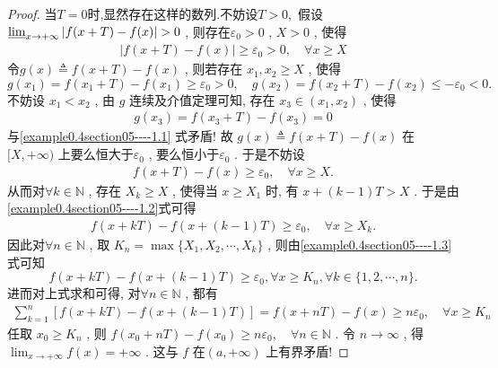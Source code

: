 \documentclass[../../main.tex]{subfiles}
\begin{document}
\begin{proof}
当$T=0$时,显然存在这样的数列.不妨设$T>0,$
假设\(\varliminf_{x \to +\infty} \vert f(x + T) - f(x)\vert > 0\) , 则存在\(\varepsilon_0 > 0\) , \(X > 0\) , 使得
\begin{align}
\vert f(x + T) - f(x)\vert \geqslant \varepsilon_0>0,\quad \forall x \geqslant X \label{example0.4section05----1.1}
\end{align}
令\(g(x) \triangleq f(x + T) - f(x)\) , 则若存在 \(x_1, x_2 \geqslant X\) , 使得
\[g(x_1) = f(x_1 + T) - f(x_1) \geqslant \varepsilon_0 > 0 ,\quad g(x_2) = f(x_2 + T) - f(x_2) \leqslant -\varepsilon_0 < 0. \]
不妨设 \(x_1 < x_2\) , 由 \(g\) 连续及介值定理可知, 存在 \(x_3 \in (x_1, x_2)\) , 使得
\begin{align*}
g(x_3) = f(x_3 + T) - f(x_3) = 0
\end{align*}
与\eqref{example0.4section05----1.1} 式矛盾! 故 \(g(x) \triangleq f(x + T) - f(x)\) 在\([X, +\infty)\) 上要么恒大于\(\varepsilon_0\) , 要么恒小于\(\varepsilon_0\) . 于是不妨设
\begin{align}
f(x + T) - f(x) \geqslant \varepsilon_0,\quad \forall x \geqslant X .\label{example0.4section05----1.2}
\end{align}
从而对\(\forall k \in \mathbb{N}\) , 存在 \(X_k \geqslant X\) , 使得当 \(x \geqslant X_1\) 时, 有
\(x + (k - 1)T > X\) .
于是由\eqref{example0.4section05----1.2}式可得
\begin{align}
f(x + kT) - f(x + (k - 1)T) \geqslant \varepsilon_0,\quad \forall x \geqslant X_k. \label{example0.4section05----1.3}
\end{align}
因此对\(\forall n \in \mathbb{N}\) , 取 \(K_n = \max\{X_1, X_2, \cdots, X_k\}\) , 则由\eqref{example0.4section05----1.3}式可知
\[
f(x + kT) - f(x + (k - 1)T)\geqslant \varepsilon_0 , \forall x \geqslant K_n ,\forall k \in \{1, 2, \cdots, n\}.
\]
进而对上式求和可得, 对\(\forall n \in \mathbb{N}\) , 都有
\begin{align*}
\sum_{k = 1}^n [f(x + kT) - f(x + (k - 1)T)] = f(x + nT) - f(x) \geqslant n\varepsilon_0,\quad \forall x \geqslant K_n
\end{align*}
任取 \(x_0 \geqslant K_n\) , 则
\(f(x_0 + nT) - f(x_0) \geqslant n\varepsilon_0,\quad \forall n \in \mathbb{N}\) .
令 \(n \to \infty\) , 得\(\lim_{x \to +\infty} f(x) = +\infty\) . 这与 \(f\) 在\((a, +\infty)\) 上有界矛盾! 
\end{proof}
\end{document}
